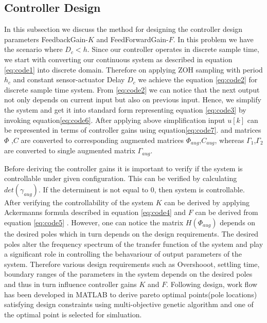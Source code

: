 \subsection{Controller Design}
In this subsection we discuss the method for designing the controller design parameters FeedbackGain-$K$ and FeedForwardGain-$F$. In this problem we have the scenario where $D_c<h$. Since our controller operates in discrete sample time, we start with converting our continuous system as described in equation \ref{eq:code1} into discrete domain. Therefore on applying ZOH sampling with period $h_c$ and constant sensor-actuator Delay $D_c$ we achieve the equation \ref{eq:code2} for discrete sample time system. From \ref{eq:code2} we can notice that the next output not only depends on current input but also on previous input. Hence, we simplify the system and get it into standard form representing equation \ref{eq:code3} by invoking equation\ref{eq:code6}. After applying above simplification input $u[k]$ can be represented in terms of controller gains using equation\ref{eq:code7}. 
and matrices $\Phi$ ,$C$ are converted to corresponding augmented matrices $\Phi_{aug}$,$C_{aug}$, whereas $\Gamma_1$,$\Gamma_2$ are converted to single augmented matrix $\Gamma_{aug}$.

Before deriving the controller gains it is important to verify if the system is controllable under given configuration. This can be verified by calculating $det(\gamma_{aug})$. If the determinent is not equal to 0, then system is controllable. After verifying the controllability of the system $K$ can be derived by applying Ackermanns formula described in equation \ref{eq:code4} and $F$ can be derived from equation \ref{eq:code5} . However, one can notice the matrix $H(\Phi_{aug})$ depends on the desired poles which in turn depends on the design requirements. The desired poles alter the frequency spectrum of the transfer function of the system and play a significant role in controlling the behavariour of output parameters of the system. Therefore various design requirements such as Overshooot, settling time, boundary ranges of the parameters in the system depends on the desired poles and thus in turn influence controller gains $K$ and $F$. Following design, work flow has been developed in MATLAB to derive pareto optimal points(pole locations) satisfying design constraints using multi-objective genetic algorithm and one of the optimal point is selected for simluation.
